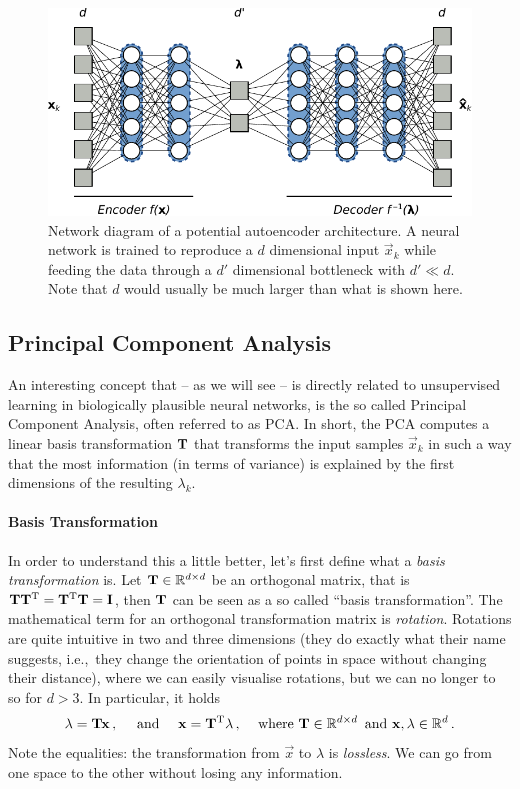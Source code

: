 \documentclass[10pt,letterpaper,oneside]{article}
\begin{document}
\begin{figure}
	\centering
	\includegraphics[scale=0.833]{media/autoencoder.pdf}
	\caption{Network diagram of a potential autoencoder architecture. A neural network is trained to reproduce a $d$ dimensional input $\vec x_k$ while feeding the data through a $d'$ dimensional bottleneck with $d' \ll d$. Note that $d$ would usually be much larger than what is shown here.}
	\label{fig:autoencoder}
\end{figure}

\subsection{Principal Component Analysis}

An interesting concept that -- as we will see -- is directly related to unsupervised learning in biologically plausible neural networks, is the so called Principal Component Analysis, often referred to as PCA. In short, the PCA computes a linear basis transformation ${\mathbf{T}}$ that transforms the input samples $\vec x_k$ in such a way that the most information (in terms of variance) is explained by the first dimensions of the resulting $\lambda_k$.

\paragraph{Basis Transformation}
In order to understand this a little better, let's first define what a \emph{basis transformation} is. Let ${\mathbf{T}} \in \mathbb{R}^{d \times d}$ be an orthogonal matrix, that is ${\mathbf{T}} {\mathbf{T}}^{\mathrm{T}} = {\mathbf{T}}^{\mathrm{T}} {\mathbf{T}} = {\mathbf{I}}$, then ${\mathbf{T}}$ can be seen as a so called \enquote{basis transformation}. The mathematical term for an orthogonal transformation matrix is \emph{rotation}. Rotations are quite intuitive in two and three dimensions (they do exactly what their name suggests, i.e.,~they change the orientation of points in space without changing their distance), where we can easily visualise rotations, but we can no longer to so for $d > 3$. In particular, it holds
\begin{align*}
	{\mathbf{\lambda}} = {\mathbf{T}} {\mathbf{x}} \,, \quad \text{ and }\quad {\mathbf{x}} = {\mathbf{T}}^{\mathrm{T}} {\mathbf{\lambda}} \,, && \text{ where } {\mathbf{T}} \in \mathbb{R}^{d \times d} \, \text{ and } {\mathbf{x}}, {\mathbf{\lambda}} \in \mathbb{R}^d \,.
\end{align*}
Note the equalities: the transformation from $\vec x$ to $\lambda$ is \emph{lossless}. We can go from one space to the other without losing any information.
\end{document}
